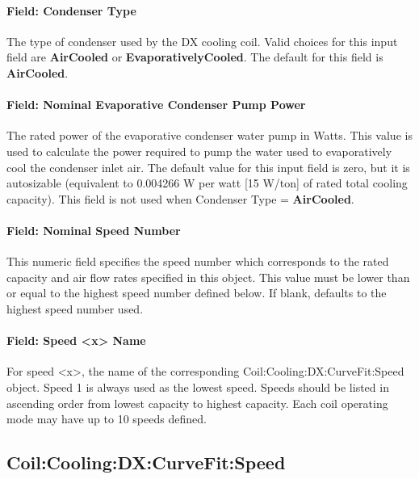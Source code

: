 \paragraph{Field: Condenser Type}

The type of condenser used by the DX cooling coil. Valid choices for this input field are \textbf{AirCooled} or \textbf{EvaporativelyCooled}. The default for this field is \textbf{AirCooled}.

\paragraph{Field: Nominal Evaporative Condenser Pump Power}\label{field-nominal-evaporative-condenser-pump-power-1}

The rated power of the evaporative condenser water pump in Watts. This value is used to calculate the power required to pump the water used to evaporatively cool the condenser inlet air. The default value for this input field is zero, but it is autosizable (equivalent to 0.004266 W per watt {[}15 W/ton{]} of rated total cooling capacity). This field is not used when Condenser Type = \textbf{AirCooled}.

\paragraph{Field: Nominal Speed Number}\label{field-nominal-speed-number}

This numeric field specifies the speed number which corresponds to the rated capacity and air flow rates specified in this object. This value must be lower than or equal to the highest speed number defined below. If blank, defaults to the highest speed number used.

\paragraph{Field: Speed \textless{}x\textgreater{} Name}\label{field-speed-x-name}

For speed \textless{}x\textgreater{}, the name of the corresponding Coil:Cooling:DX:CurveFit:Speed object. Speed 1 is always used as the lowest speed. Speeds should be listed in ascending order from lowest capacity to highest capacity. Each coil operating mode may have up to 10 speeds defined.

\subsection{Coil:Cooling:DX:CurveFit:Speed}\label{coilcoolingdxcurvefitspeed}

